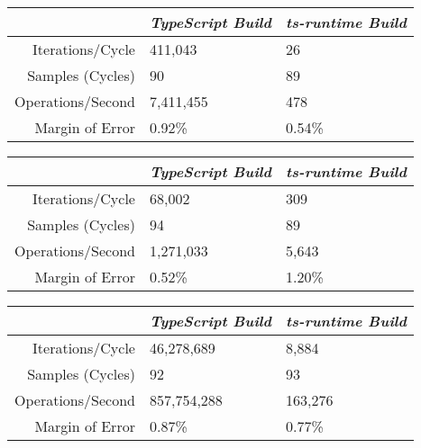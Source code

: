 \begin{center}
{
\centering
\tabulinesep=1.2mm
\setlength{\tabcolsep}{5mm}
\def\arraystretch{1.25}
\small
\begin{tabu} to \textwidth {|r||X[c,m]|X[c,m]|}
  \hline
  & \emph{TypeScript Build} & \emph{ts-runtime Build} \\
  \hline
  \hline
  Iterations/Cycle  & 411,043 & 26 \\
  \hline
  Samples (Cycles)  & 90 & 89 \\
  \hline
  Operations/Second & 7,411,455 & 478 \\
  \hline
  Margin of Error   & 0.92\% & 0.54\% \\
  \hline
\end{tabu}
}
\end{center}

\begin{center}
{
\centering
\tabulinesep=1.2mm
\setlength{\tabcolsep}{5mm}
\def\arraystretch{1.25}
\small
\begin{tabu} to \textwidth {|r||X[c,m]|X[c,m]|}
  \hline
  & \emph{TypeScript Build} & \emph{ts-runtime Build} \\
  \hline
  \hline
  Iterations/Cycle  & 68,002 & 309 \\
  \hline
  Samples (Cycles)  & 94 & 89 \\
  \hline
  Operations/Second & 1,271,033 & 5,643 \\
  \hline
  Margin of Error   & 0.52\% & 1.20\% \\
  \hline
\end{tabu}
}
\end{center}

\begin{center}
{
\centering
\tabulinesep=1.2mm
\setlength{\tabcolsep}{5mm}
\def\arraystretch{1.25}
\small
\begin{tabu} to \textwidth {|r||X[c,m]|X[c,m]|}
  \hline
  & \emph{TypeScript Build} & \emph{ts-runtime Build} \\
  \hline
  \hline
  Iterations/Cycle  & 46,278,689 & 8,884 \\
  \hline
  Samples (Cycles)  & 92 & 93 \\
  \hline
  Operations/Second & 857,754,288 & 163,276 \\
  \hline
  Margin of Error   & 0.87\% & 0.77\% \\
  \hline
\end{tabu}
}
\end{center}

